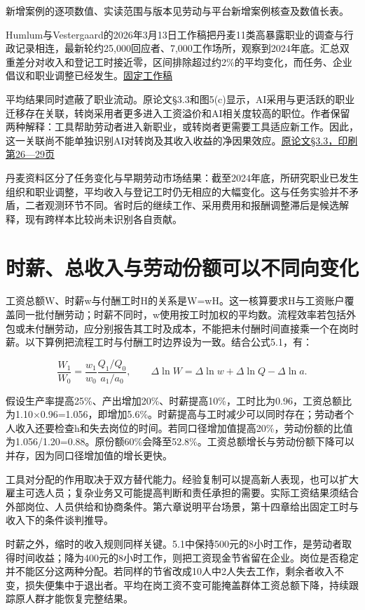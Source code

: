 \documentclass[UTF8,fontset=windows,12pt,a4paper,oneside,openany]{ctexbook}
\begin{document}
新增案例的逐项数值、实读范围与版本见劳动与平台新增案例核查及数值长表。

Humlum与Vestergaard的2026年3月13日工作稿把丹麦11类高暴露职业的调查与行政记录相连，最新轮约25,000回应者、7,000工作场所，观察到2024年底。汇总双重差分对收入和登记工时接近零，区间排除超过约2\%的平均变化，而任务、企业倡议和职业调整已经发生。\href{https://www.rfberlin.com/wp-content/uploads/2026/03/26078.pdf}{固定工作稿}

平均结果同时遮蔽了职业流动。原论文§3.3和图5(c)显示，AI采用与更活跃的职业迁移存在关联，转岗采用者更多进入工资溢价和AI相关度较高的职位。作者保留两种解释：工具帮助劳动者进入新职业，或转岗者更需要工具适应新工作。因此，这一关联尚不能单独识别AI对转岗及其收入收益的净因果效应。\href{https://www.rfberlin.com/wp-content/uploads/2026/03/26078.pdf}{原论文§3.3，印刷第26—29页}

丹麦资料区分了任务变化与早期劳动市场结果：截至2024年底，所研究职业已发生组织和职业调整，平均收入与登记工时仍无相应的大幅变化。这与任务实验并不矛盾，二者观测环节不同。省时后的继续工作、采用费用和报酬调整滞后是候选解释，现有跨样本比较尚未识别各自贡献。

\section{时薪、总收入与劳动份额可以不同向变化}

工资总额W、时薪w与付酬工时H的关系是W=wH。这一核算要求H与工资账户覆盖同一批付酬劳动；时薪不同时，w使用按工时加权的平均数。流程效率若包括外包或未付酬劳动，应分别报告其工时及成本，不能把未付酬时间直接乘一个在岗时薪。以下算例把流程工时与付酬工时边界设为一致。结合公式5.1，有：

\[
\frac{W_1}{W_0}=\frac{w_1}{w_0}\frac{Q_1/Q_0}{a_1/a_0},
\qquad
\Delta\ln W=\Delta\ln w+\Delta\ln Q-\Delta\ln a.
\tag{5.6}
\]

假设生产率提高25\%、产出增加20\%、时薪提高10\%，工时比为0.96，工资总额比为1.10\ensuremath{\times}0.96=1.056，即增加5.6\%。时薪提高与工时减少可以同时存在；劳动者个人收入还要检查h和失去岗位的时间。若同口径增加值提高20\%，劳动份额的比值为1.056/1.20=0.88。原份额60\%会降至52.8\%。工资总额增长与劳动份额下降可以并存，因为同口径增加值的增长更快。

工具对分配的作用取决于双方替代能力。经验复制可以提高新人表现，也可以扩大雇主可选人员；复杂业务又可能提高判断和责任承担的需要。实际工资结果须结合外部岗位、人员供给和协商条件。第六章说明平台场景，第十四章给出固定工时与收入下的条件谈判推导。

时薪之外，缩时的收入规则同样关键。5.1中保持500元的8小时工作，是劳动者取得时间收益；降为400元的8小时工作，则把工资现金节省留在企业。岗位是否稳定并不能区分这两种分配。若同样的节省改成10人中2人失去工作，剩余者收入不变，损失便集中于退出者。平均在岗工资不变可能掩盖群体工资总额下降，持续跟踪原人群才能恢复完整结果。
\end{document}
